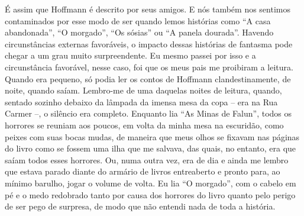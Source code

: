 É assim que Hoffmann é descrito por seus amigos. E nós também nos
sentimos contaminados por esse modo de ser quando lemos histórias como
``A casa abandonada'', ``O morgado'', ``Os sósias'' ou ``A panela
dourada''. Havendo circunstâncias externas favoráveis, o impacto dessas
histórias de fantasma pode chegar a um grau muito surpreendente. Eu
mesmo passei por isso e a circunstância favorável, nesse caso, foi que
os meus pais me proibiram a leitura. Quando era pequeno, só podia ler os
contos de Hoffmann clandestinamente, de noite, quando saíam. Lembro-me
de uma daquelas noites de leitura, quando, sentado sozinho debaixo da
lâmpada da imensa mesa da copa -- era na Rua Carmer --, o silêncio era
completo. Enquanto lia ``As Minas de Falun'', todos os horrores se
reuniam aos poucos, em volta da minha mesa na escuridão, como peixes com
suas bocas mudas, de maneira que meus olhos se fixavam nas páginas do
livro como se fossem uma ilha que me salvava, das quais, no entanto, era
que saíam todos esses horrores. Ou, numa outra vez, era de dia e ainda
me lembro que estava parado diante do armário de livros entreaberto e
pronto para, ao mínimo barulho, jogar o volume de volta. Eu lia ``O
morgado'', com o cabelo em pé e o medo redobrado tanto por causa dos
horrores do livro quanto pelo perigo de ser pego de surpresa, de modo
que não entendi nada de toda a história.

